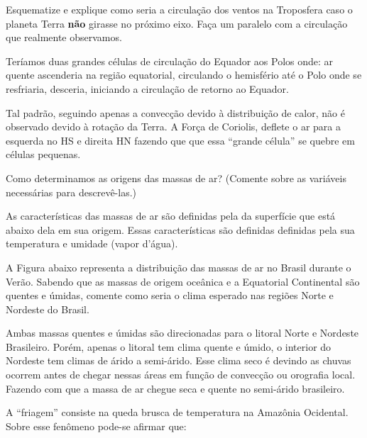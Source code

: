 \documentclass[letterpaper,portuguese,12pt,pdftex]{exam}
\begin{document}
\begin{questions}
\question[3]
Esquematize e explique como seria a circulação dos ventos na Troposfera
caso o planeta Terra {\bf não} girasse no próximo eixo.  Faça um paralelo com a
circulação que realmente observamos.

\begin{solution}
  Teríamos duas grandes células de circulação do Equador aos Polos onde: ar
  quente ascenderia na região equatorial, circulando o hemisfério até o Polo
  onde se resfriaria, desceria, iniciando a circulação de retorno ao Equador.

  Tal padrão, seguindo apenas a convecção devido à distribuição de calor, não é
  observado devido à rotação da Terra.  A Força de Coriolis, deflete o ar para a
  esquerda no HS e direita HN fazendo que que essa ``grande célula'' se quebre
  em células pequenas.
\end{solution}

\question[2\half]
Como determinamos as origens das massas de ar?  (Comente sobre as variáveis
necessárias para descrevê-las.)

\begin{solution}
  As características das massas de ar são definidas pela da superfície que está
  abaixo dela em sua origem.  Essas características são definidas definidas pela
  sua temperatura e umidade (vapor d'água).
\end{solution}

\question[1\half]
A Figura abaixo representa a distribuição das massas de ar no Brasil durante
o Verão.  Sabendo que as massas de origem oceânica e a Equatorial Continental
são quentes e úmidas, comente como seria o clima esperado nas regiões Norte e
Nordeste do Brasil.

\begin{solution}
  Ambas massas quentes e úmidas são direcionadas para o litoral Norte e Nordeste
  Brasileiro.  Porém, apenas o litoral tem clima quente e úmido, o interior do
  Nordeste tem climas de árido a semi-árido.  Esse clima seco é devindo as
  chuvas ocorrem antes de chegar nessas áreas em função de convecção ou
  orografia local.  Fazendo com que a massa de ar chegue seca e quente no
  semi-árido brasileiro.
\end{solution}


\question[2]
A ``friagem'' consiste na queda brusca de temperatura na Amazônia Ocidental.
Sobre esse fenômeno pode-se afirmar que:


\end{questions}
\end{document}

